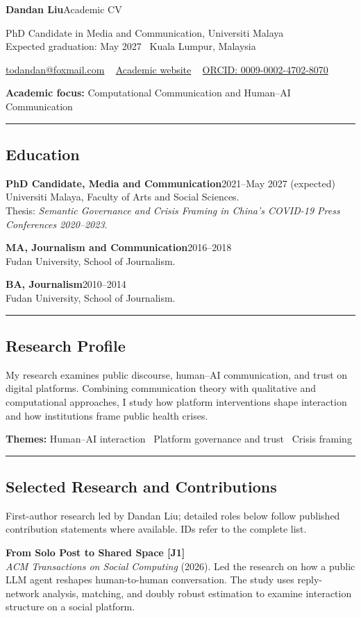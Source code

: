 \documentclass[a4paper,11pt]{article}
\newcommand{\sep}{{\,\textperiodcentered\,\,}}
\newcommand{\hsep}{\noindent\textcolor{teal}{\rule{\textwidth}{0.5pt}}}
\newcommand{\block}[1]{\par\addvspace{7pt}\Needspace{5\baselineskip}\hsep\vspace{-8pt}\subsection*{#1}}
\begin{document}
\thispagestyle{opening}
{\fontsize{26}{30}\selectfont\color{navy}\textbf{Dandan Liu}}\hfill{\small Academic CV}\par
{\small PhD Candidate in Media and Communication, Universiti Malaya\\
Expected graduation: May 2027 \sep Kuala Lumpur, Malaysia}\par
{\small\href{mailto:todandan@foxmail.com}{todandan@foxmail.com} \sep
\href{https://s2134717ldd.github.io/smiledan713.github.io/}{Academic website} \sep
\href{https://orcid.org/0009-0002-4702-8070}{ORCID: 0009-0002-4702-8070}}\par
{\small\textbf{Academic focus:} Computational Communication and Human--AI Communication}

\block{Education}
\textbf{PhD Candidate, Media and Communication}\hfill 2021--May 2027 (expected)\\
Universiti Malaya, Faculty of Arts and Social Sciences.\\
{\small Thesis: \emph{Semantic Governance and Crisis Framing in China's COVID-19 Press Conferences 2020--2023}.}

\textbf{MA, Journalism and Communication}\hfill 2016--2018\\
Fudan University, School of Journalism.

\textbf{BA, Journalism}\hfill 2010--2014\\
Fudan University, School of Journalism.

\block{Research Profile}
My research examines public discourse, human--AI communication, and trust on digital platforms. Combining communication theory with qualitative and computational approaches, I study how platform interventions shape interaction and how institutions frame public health crises.
\par{\small\textbf{Themes:} Human--AI interaction \sep Platform governance and trust \sep Crisis framing}

\block{Selected Research and Contributions}
{\small First-author research led by Dandan Liu; detailed roles below follow published contribution statements where available. IDs refer to the complete list.}\par
{}
\textbf{From Solo Post to Shared Space [J1]}\\
{\small \emph{ACM Transactions on Social Computing} (2026). Led the research on how a public LLM agent reshapes human-to-human conversation. The study uses reply-network analysis, matching, and doubly robust estimation to examine interaction structure on a social platform.}
\end{document}
